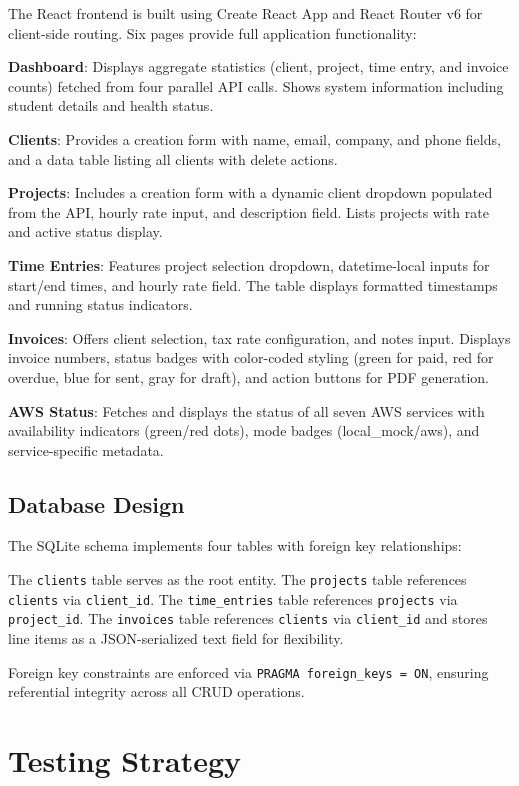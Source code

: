 \documentclass[conference]{IEEEtran}
\begin{document}
The React frontend is built using Create React App and React Router v6 for client-side routing. Six pages provide full application functionality:

\textbf{Dashboard}: Displays aggregate statistics (client, project, time entry, and invoice counts) fetched from four parallel API calls. Shows system information including student details and health status.

\textbf{Clients}: Provides a creation form with name, email, company, and phone fields, and a data table listing all clients with delete actions.

\textbf{Projects}: Includes a creation form with a dynamic client dropdown populated from the API, hourly rate input, and description field. Lists projects with rate and active status display.

\textbf{Time Entries}: Features project selection dropdown, datetime-local inputs for start/end times, and hourly rate field. The table displays formatted timestamps and running status indicators.

\textbf{Invoices}: Offers client selection, tax rate configuration, and notes input. Displays invoice numbers, status badges with color-coded styling (green for paid, red for overdue, blue for sent, gray for draft), and action buttons for PDF generation.

\textbf{AWS Status}: Fetches and displays the status of all seven AWS services with availability indicators (green/red dots), mode badges (local\_mock/aws), and service-specific metadata.

\subsection{Database Design}

The SQLite schema implements four tables with foreign key relationships:

The \texttt{clients} table serves as the root entity. The \texttt{projects} table references \texttt{clients} via \texttt{client\_id}. The \texttt{time\_entries} table references \texttt{projects} via \texttt{project\_id}. The \texttt{invoices} table references \texttt{clients} via \texttt{client\_id} and stores line items as a JSON-serialized text field for flexibility.

Foreign key constraints are enforced via \texttt{PRAGMA foreign\_keys = ON}, ensuring referential integrity across all CRUD operations.

\section{Testing Strategy}
\end{document}
